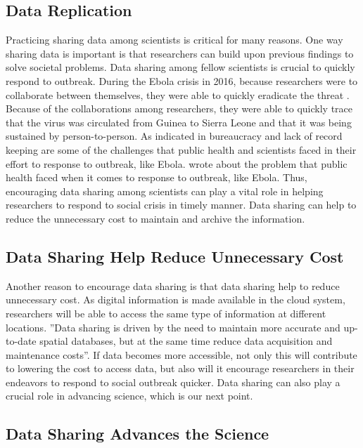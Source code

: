 \documentclass[sigconf]{acmart}
\begin{document}
\subsection{Data Replication}

Practicing sharing data among scientists is critical for many reasons. One way sharing data is important is that researchers can build upon previous findings to solve societal problems. Data sharing among fellow scientists is crucial to quickly respond to outbreak. During the Ebola crisis in 2016, because researchers were to collaborate between themselves, they were able to quickly eradicate the threat \cite{yozwiak2015data}. Because of the collaborations among researchers, they were able to quickly trace that the virus was circulated from Guinea to Sierra Leone and that it was being sustained by person-to-person. As indicated in \cite{vogel2014delays} bureaucracy and lack of record keeping are some of the challenges that public health and scientists faced in their effort to response to outbreak, like Ebola. wrote about the problem that public health faced when it comes to response to outbreak, like Ebola. Thus, encouraging data sharing among scientists can play a vital role in helping researchers to respond to social crisis in timely manner. Data sharing can help to reduce the unnecessary cost to maintain and archive the information. 

\subsection{Data Sharing Help Reduce Unnecessary Cost
}

Another reason to encourage data sharing is that data sharing help to reduce unnecessary cost. As digital information is made available in the cloud system, researchers will be able to access the same type of information at different locations.  ''Data sharing is driven by the need to maintain more accurate and up-to-date spatial databases, but at the same time reduce data acquisition and maintenance costs''\cite{stoakes2005data}. If data becomes more accessible, not only this will contribute to lowering the cost to access data, but also will it encourage researchers in their endeavors to respond to social outbreak quicker. Data sharing can also play a crucial role in advancing science, which is our next point. 

\subsection{Data Sharing Advances the Science}
\end{document}
